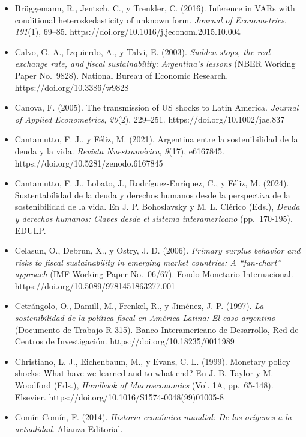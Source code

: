 \begin{itemize}[label={},leftmargin=1.27cm,itemindent=-1.27cm,itemsep=0.6\baselineskip]
  \emph{78}(312), 868--887. https://doi.org/10.2307/2229183
\item
  Brüggemann, R., Jentsch, C., y Trenkler, C. (2016). Inference in VARs
  with conditional heteroskedasticity of unknown form. \emph{Journal of
  Econometrics}, \emph{191}(1), 69--85.
  https://doi.org/10.1016/j.jeconom.2015.10.004
\item
  Calvo, G. A., Izquierdo, A., y Talvi, E. (2003). \emph{Sudden stops,
  the real exchange rate, and fiscal sustainability: Argentina's
  lessons} (NBER Working Paper No.~9828). National Bureau of Economic
  Research. https://doi.org/10.3386/w9828
\item
  Canova, F. (2005). The transmission of US shocks to Latin America.
  \emph{Journal of Applied Econometrics}, \emph{20}(2), 229--251.
  https://doi.org/10.1002/jae.837
\item
  Cantamutto, F. J., y Féliz, M. (2021). Argentina entre la
  sostenibilidad de la deuda y la vida. \emph{Revista Nuestramérica},
  \emph{9}(17), e6167845. https://doi.org/10.5281/zenodo.6167845
\item
  Cantamutto, F. J., Lobato, J., Rodríguez-Enríquez, C., y Féliz, M.
  (2024). Sustentabilidad de la deuda y derechos humanos desde la
  perspectiva de la sostenibilidad de la vida. En J. P. Bohoslavsky y M.
  L. Clérico (Eds.), \emph{Deuda y derechos humanos: Claves desde el
  sistema interamericano} (pp.~170-195). EDULP.
\item
  Celasun, O., Debrun, X., y Ostry, J. D. (2006). \emph{Primary surplus
  behavior and risks to fiscal sustainability in emerging market
  countries: A ``fan-chart'' approach} (IMF Working Paper No.~06/67).
  Fondo Monetario Internacional.
  https://doi.org/10.5089/9781451863277.001
\item
  Cetrángolo, O., Damill, M., Frenkel, R., y Jiménez, J. P. (1997).
  \emph{La sostenibilidad de la política fiscal en América Latina: El
  caso argentino} (Documento de Trabajo R-315). Banco Interamericano de
  Desarrollo, Red de Centros de Investigación.
  https://doi.org/10.18235/0011989
\item
  Christiano, L. J., Eichenbaum, M., y Evans, C. L. (1999). Monetary
  policy shocks: What have we learned and to what end? En J. B. Taylor y
  M. Woodford (Eds.), \emph{Handbook of Macroeconomics} (Vol. 1A,
  pp.~65-148). Elsevier. https://doi.org/10.1016/S1574-0048(99)01005-8
\item
  Comín Comín, F. (2014). \emph{Historia económica mundial: De los
  orígenes a la actualidad}. Alianza Editorial.

\end{itemize}
